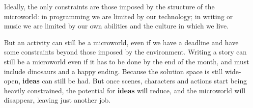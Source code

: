 Ideally, the only constraints are those imposed by the structure of the
microworld: in programming we are limited by our technology; in writing
or music we are limited by our own abilities and the culture in which we
live.

But an activity can still be a microworld, even if we have a deadline
and have some constraints beyond those imposed by the environment. Writing
a story can still be a microworld even if it has to be done by the end
of the month, and must include dinosaurs and a happy ending. Because the solution space is still wide-open, \textbf{ideas} can still
be had. But once scenes, characters and actions start being heavily
constrained, the potential for \textbf{ideas} will reduce, and the
microworld will disappear, leaving just another job.

